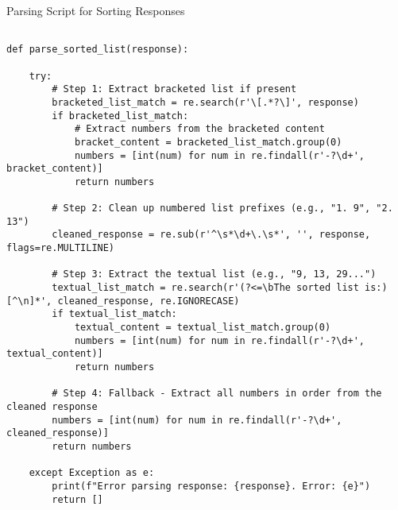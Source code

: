 
\onecolumn
\begin{prompt}{Parsing Script for Sorting Responses}{}

\begin{lstlisting}

def parse_sorted_list(response):

    try:
        # Step 1: Extract bracketed list if present
        bracketed_list_match = re.search(r'\[.*?\]', response)
        if bracketed_list_match:
            # Extract numbers from the bracketed content
            bracket_content = bracketed_list_match.group(0)
            numbers = [int(num) for num in re.findall(r'-?\d+', bracket_content)]
            return numbers
        
        # Step 2: Clean up numbered list prefixes (e.g., "1. 9", "2. 13")
        cleaned_response = re.sub(r'^\s*\d+\.\s*', '', response, flags=re.MULTILINE)
        
        # Step 3: Extract the textual list (e.g., "9, 13, 29...")
        textual_list_match = re.search(r'(?<=\bThe sorted list is:)[^\n]*', cleaned_response, re.IGNORECASE)
        if textual_list_match:
            textual_content = textual_list_match.group(0)
            numbers = [int(num) for num in re.findall(r'-?\d+', textual_content)]
            return numbers
        
        # Step 4: Fallback - Extract all numbers in order from the cleaned response
        numbers = [int(num) for num in re.findall(r'-?\d+', cleaned_response)]
        return numbers
    
    except Exception as e:
        print(f"Error parsing response: {response}. Error: {e}")
        return []



\end{lstlisting}

\end{prompt}

\twocolumn